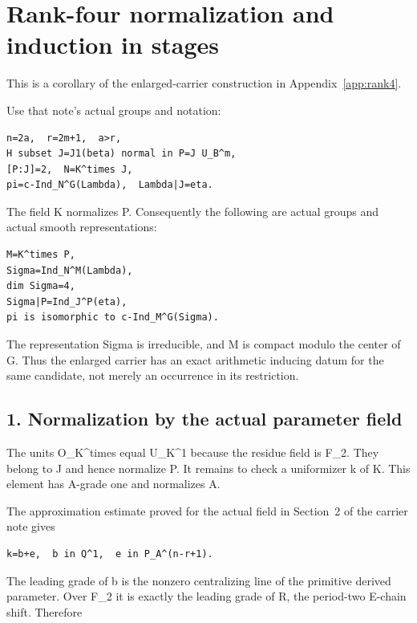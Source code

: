 \clearpage
\section{Rank-four normalization and induction in stages}\label{app:rank4_stages}

This is a corollary of the enlarged-carrier construction in
Appendix~\ref{app:rank4}.

Use that note's actual groups and notation:

\begin{Verbatim}[fontsize=\small,breaklines=true,breakanywhere=true]
n=2a,  r=2m+1,  a>r,
H subset J=J1(beta) normal in P=J U_B^m,
[P:J]=2,  N=K^times J,
pi=c-Ind_N^G(Lambda),  Lambda|J=eta.
\end{Verbatim}

The field K normalizes P. Consequently the following are actual groups
and actual smooth representations:

\begin{Verbatim}[fontsize=\small,breaklines=true,breakanywhere=true]
M=K^times P,
Sigma=Ind_N^M(Lambda),
dim Sigma=4,
Sigma|P=Ind_J^P(eta),
pi is isomorphic to c-Ind_M^G(Sigma).
\end{Verbatim}

The representation Sigma is irreducible, and M is compact modulo the
center of G. Thus the enlarged carrier has an exact arithmetic inducing
datum for the same candidate, not merely an occurrence in its
restriction.

\hypertarget{rank4_stages-normalization-by-the-actual-parameter-field}{%
\subsection{1. Normalization by the actual parameter
field}\label{rank4_stages-normalization-by-the-actual-parameter-field}}

The units O\_K\^{}times equal U\_K\^{}1 because the residue field is
F\_2. They belong to J and hence normalize P. It remains to check a
uniformizer k of K. This element has A-grade one and normalizes A.

The approximation estimate proved for the actual field in Section~2 of the
carrier note gives

\begin{Verbatim}[fontsize=\small,breaklines=true,breakanywhere=true]
k=b+e,  b in Q^1,  e in P_A^(n-r+1).
\end{Verbatim}

The leading grade of b is the nonzero centralizing line of the primitive
derived parameter. Over F\_2 it is exactly the leading grade of R, the
period-two E-chain shift. Therefore

